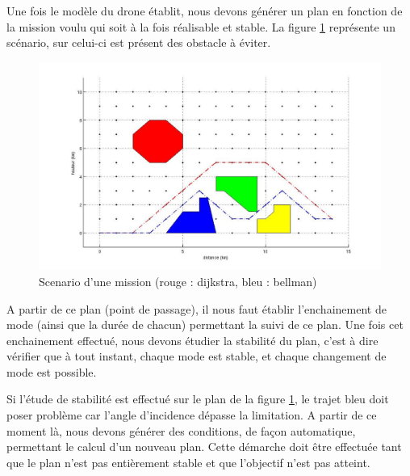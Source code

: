 \documentclass[a4paper,11pt,final]{article}
\theoremstyle{plain}
\theoremstyle{definition}
\theoremstyle{remark}
\begin{document}
Une fois le modèle du drone établit, nous devons générer un plan en fonction de la mission voulu qui soit à la fois réalisable et stable. La figure \ref{scenario} représente un scénario, sur celui-ci est présent des obstacle à éviter.

\begin{figure}
	\centering
	
\includegraphics[scale=0.6]{images/scenario.jpg}
\caption{Scenario d'une mission (rouge : dijkstra, bleu : bellman)}
\label{scenario}
\end{figure}

A partir de ce plan (point de passage), il nous faut établir l'enchainement de mode (ainsi que la durée de chacun) permettant la suivi de ce plan.
Une fois cet enchainement effectué, nous devons étudier la stabilité du plan, c'est à dire vérifier que à tout instant, chaque mode est stable, et chaque changement de mode est possible.

Si l'étude de stabilité est effectué sur le plan de la figure \ref{scenario}, le trajet bleu doit poser problème car l'angle d'incidence dépasse la limitation. A partir de ce moment là, nous devons générer des conditions, de façon automatique, permettant le calcul d'un nouveau plan. Cette démarche doit être effectuée tant que le plan n'est pas entièrement stable et que l'objectif n'est pas atteint.






\end{document}
